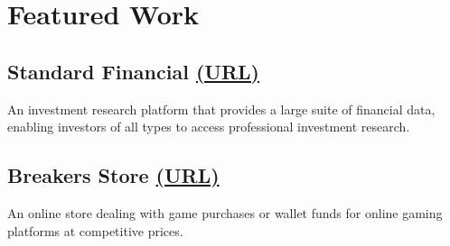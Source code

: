 \section*{Featured Work}
%
%
%
\subsection*{
  Standard Financial
  \small\grayColor
  \href{https://bumbleboss.xyz/w/standard-financial}{(URL)}
}
An investment research platform that provides a large suite of financial data, enabling investors of all types to access professional investment research.
%
%
\subsection*{
  Breakers Store
  \small\grayColor
  \href{https://bumbleboss.xyz/w/breakers-store}{(URL)}
}
An online store dealing with game purchases or wallet funds for online gaming platforms at competitive prices.
%
%